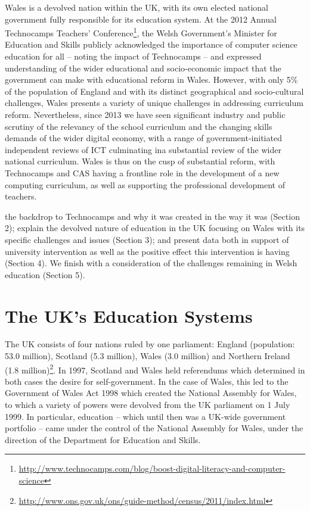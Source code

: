 \documentclass{sig-alternate}
\begin{document}
Wales is a devolved nation within the UK, with its own elected
national government fully responsible for its education system.  At
the 2012 Annual Technocamps Teachers'
Conference\footnote{\url{http://www.technocamps.com/blog/boost-digital-literacy-and-computer-science}},
the Welsh Government's Minister for Education and Skills publicly
acknowledged the importance of computer science education for all --
noting the impact of Technocamps -- and expressed understanding of the
wider educational and socio-economic impact that the government can
make with educational reform in Wales.  However, with only 5\% of the
population of England and with its distinct geographical and
socio-cultural challenges, Wales presents a variety of unique
challenges in addressing curriculum reform. Nevertheless, since 2013
we have seen significant industry and public scrutiny of the relevancy
of the school curriculum and the changing skills demands of the wider
digital economy, with a range of government-initiated independent
reviews of ICT culminating ina substantial review of the wider
national curriculum. Wales is thus on the cusp of substantial reform,
with Technocamps and CAS having a frontline role in the development of
a new computing curriculum, as well as supporting the professional
development of teachers.

the backdrop to Technocamps and why it was created in the way it was
(Section 2); explain the devolved nature of education in the UK
focusing on Wales with its specific challenges and issues (Section 3);
and present data both in support of university intervention as well as
the positive effect this intervention is having (Section 4).  We
finish with a consideration of the challenges remaining in Welsh
education (Section 5).

\section{The UK's Education Systems}

The UK consists of four nations ruled by one parliament:
England (population: 53.0 million), Scotland (5.3 million),
Wales (3.0 million) and Northern Ireland (1.8
million)\footnote{\url{http://www.ons.gov.uk/ons/guide-method/census/2011/index.html}}.
In 1997, Scotland and Wales held referendums which
determined in both cases the desire for self-government.
In the case of Wales, this led to the Government of Wales Act 1998
which created the National Assembly for Wales, to which
a variety of powers were devolved from the UK parliament
on 1 July 1999.
In particular, education
-- which until then was a UK-wide government portfolio --
came under the control of the National Assembly for Wales,
under the direction of the Department for Education and Skills.
\end{document}
